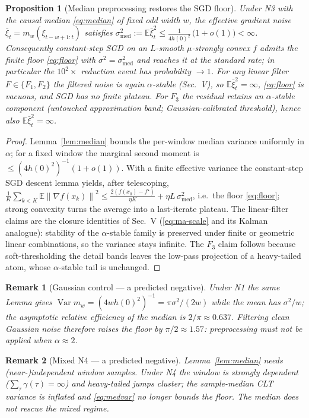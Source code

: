 \documentclass[conference]{IEEEtran}
\newtheorem{proposition}{Proposition}
\newtheorem{remark}{Remark}
\newcommand{\E}{\mathbb{E}}
\newcommand{\norm}[1]{\left\lVert#1\right\rVert}
\DeclareMathOperator{\Var}{Var}
\begin{document}
\begin{proposition}[Median preprocessing restores the SGD floor]
\label{prop:rescue}
Under N3 with the causal median \eqref{eq:median} of fixed odd width
$w$, the effective gradient noise
$\bar\xi_t=m_w(\xi_{t-w+1:t})$ satisfies
$\sigma_{\mathrm{med}}^2:=\E\bar\xi_t^2\le \tfrac{1}{4 h(0)^2}\,
\big(1+o(1)\big)<\infty$. Consequently constant-step SGD on an
$L$-smooth $\mu$-strongly convex $f$ admits the finite floor
\eqref{eq:floor} with $\sigma^2=\sigma_{\mathrm{med}}^2$ and reaches it
at the standard rate; in particular the $10^2\times$ reduction event
has probability $\to1$. For any \emph{linear} filter $F\in\{F_1,F_2\}$
the filtered noise is again $\alpha$-stable (Sec.\ V), so
$\E\bar\xi_t^2=\infty$, \eqref{eq:floor} is vacuous, and SGD has no
finite plateau. For $F_3$ the residual retains an $\alpha$-stable
component (untouched approximation band; Gaussian-calibrated
threshold), hence also $\E\bar\xi_t^2=\infty$.
\end{proposition}
\begin{proof}
Lemma~\ref{lem:median} bounds the per-window median variance uniformly
in $\alpha$; for a fixed window the marginal second moment is
$\le(4h(0)^2)^{-1}(1+o(1))$. With a finite effective variance the
constant-step SGD descent lemma yields, after telescoping,
$\frac1K\sum_{k<K}\E\norm{\nabla f(x_k)}^2
\le \frac{2(f(x_0)-f^\star)}{\eta K}+\eta L\,\sigma_{\mathrm{med}}^2$,
i.e.\ the floor \eqref{eq:floor}; strong convexity turns the average
into a last-iterate plateau. The linear-filter claims are the closure
identities of Sec.\ V (\eqref{eq:ma-scale} and its Kalman analogue):
stability of the $\alpha$-stable family is preserved under finite or
geometric linear combinations, so the variance stays infinite. The
$F_3$ claim follows because soft-thresholding the detail bands leaves
the low-pass projection of a heavy-tailed atom, whose $\alpha$-stable
tail is unchanged.
\end{proof}

\begin{remark}[Gaussian control --- a predicted negative]
Under N1 the same Lemma gives
$\Var m_w=(4wh(0)^2)^{-1}=\pi\sigma^2/(2w)$ while the mean has
$\sigma^2/w$; the asymptotic relative efficiency of the median is
$2/\pi\approx0.637$. Filtering clean Gaussian noise therefore
\emph{raises} the floor by $\pi/2\approx1.57$: preprocessing must not
be applied when $\alpha\approx2$.
\end{remark}

\begin{remark}[Mixed N4 --- a predicted negative]
Lemma~\ref{lem:median} needs (near-)independent window samples. Under
N4 the window is strongly dependent ($\sum_\tau\gamma(\tau)=\infty$)
and heavy-tailed jumps cluster; the sample-median CLT variance is
inflated and \eqref{eq:medvar} no longer bounds the floor. The median
does not rescue the mixed regime.
\end{remark}
\end{document}
